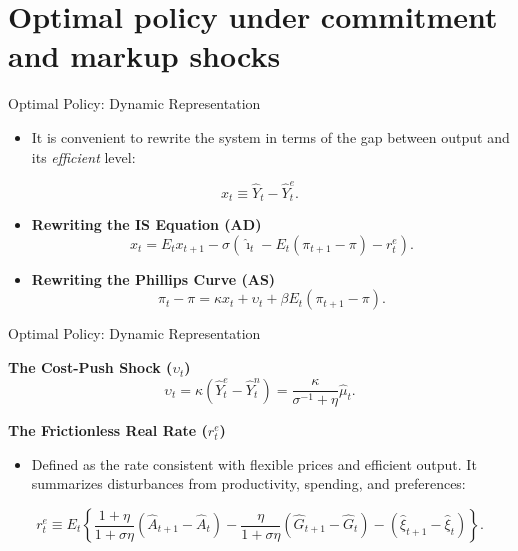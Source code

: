 \documentclass[11pt,aspectratio=169]{beamer}
\begin{document}
\section{Optimal policy under commitment and markup shocks}
\begin{frame}{Optimal Policy: Dynamic Representation}
\small
\begin{itemize}
  \item It is convenient to rewrite the system in terms of the gap between output and its \emph{efficient} level:
\end{itemize}
\begin{equation*}
x_{t}\equiv \hat{Y}_{t}-\hat{Y}_{t}^{e}.
\end{equation*}

\begin{itemize}
  \item \textbf{Rewriting the IS Equation (AD)}
    \begin{equation}
    x_{t}=E_{t}x_{t+1}-\sigma \left( \hat{\imath}_{t}-E_{t}(\pi _{t+1}-\pi)-r_{t}^{e}\right). \label{AD4}
    \end{equation}
  \item \textbf{Rewriting the Phillips Curve (AS)}
    \begin{equation}
    \pi _{t}-\pi =\kappa x_{t}+\upsilon _{t}+\beta E_{t}(\pi _{t+1}-\pi ). \label{AS4}
    \end{equation}
\end{itemize}

\end{frame}

\begin{frame}{Optimal Policy: Dynamic Representation}
\small

\textbf{The Cost-Push Shock ($\upsilon_t$)}
\begin{equation*}
\upsilon _{t}=\kappa (\hat{Y}_{t}^{e}-\hat{Y}_{t}^{n})=\frac{\kappa }{\sigma^{-1}+\eta }\hat{\mu}_{t}.
\end{equation*}

\textbf{The Frictionless Real Rate ($r_t^e$)}
\begin{itemize}
  \item Defined as the rate consistent with flexible prices and efficient output. It summarizes disturbances from productivity, spending, and preferences:
\end{itemize}
\begin{equation*}
r_{t}^{e}\equiv E_{t}\left\{ \frac{1+\eta }{1+\sigma \eta }\left( \hat{A}_{t+1}-\hat{A}_{t}\right) -\frac{\eta }{1+\sigma \eta }(\hat{G}_{t+1}-\hat{G}_{t})-(\hat{\xi}_{t+1}-\hat{\xi}_{t})\right\}.
\end{equation*}

\end{frame}
\end{document}
